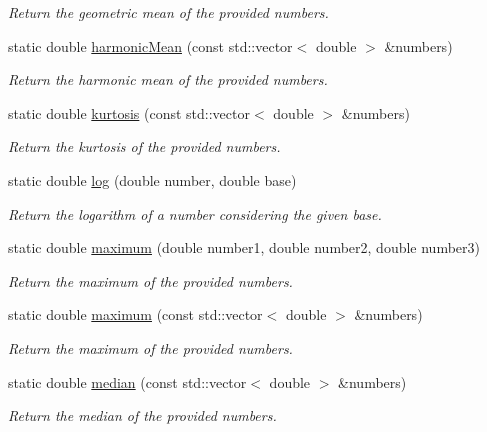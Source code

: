 \begin{DoxyCompactItemize}
\begin{DoxyCompactList}\small\item\em Return the geometric mean of the provided numbers. \end{DoxyCompactList}\item 
static double \hyperlink{classmultiscale_1_1Numeric_a7ed4c2e74893a486e639051abfbbcdb7}{harmonic\-Mean} (const std\-::vector$<$ double $>$ \&numbers)
\begin{DoxyCompactList}\small\item\em Return the harmonic mean of the provided numbers. \end{DoxyCompactList}\item 
static double \hyperlink{classmultiscale_1_1Numeric_a71ef1e4e0e845b64bcb06a27b9f8fbd3}{kurtosis} (const std\-::vector$<$ double $>$ \&numbers)
\begin{DoxyCompactList}\small\item\em Return the kurtosis of the provided numbers. \end{DoxyCompactList}\item 
static double \hyperlink{classmultiscale_1_1Numeric_a27b50deac29d8aca5c41c8b19fba43e9}{log} (double number, double base)
\begin{DoxyCompactList}\small\item\em Return the logarithm of a number considering the given base. \end{DoxyCompactList}\item 
static double \hyperlink{classmultiscale_1_1Numeric_a54d5578d5980315b7bade31a5655cd72}{maximum} (double number1, double number2, double number3)
\begin{DoxyCompactList}\small\item\em Return the maximum of the provided numbers. \end{DoxyCompactList}\item 
static double \hyperlink{classmultiscale_1_1Numeric_ab55b4d890c6221a8e10b37a0e5f2cbdc}{maximum} (const std\-::vector$<$ double $>$ \&numbers)
\begin{DoxyCompactList}\small\item\em Return the maximum of the provided numbers. \end{DoxyCompactList}\item 
static double \hyperlink{classmultiscale_1_1Numeric_a254f9df60a269739a1bfd5e7c383aed2}{median} (const std\-::vector$<$ double $>$ \&numbers)
\begin{DoxyCompactList}\small\item\em Return the median of the provided numbers. \end{DoxyCompactList}\item 

\end{DoxyCompactItemize}
